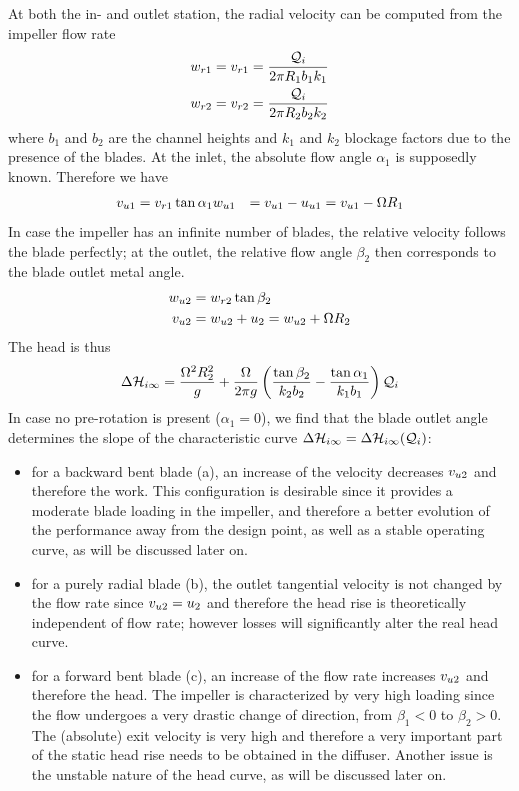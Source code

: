 At both the in- and outlet station, the radial velocity can be
computed from the impeller flow rate
\begin{align*}
  w_{r1} &= v_{r1} = \frac{\mathcal Q_i}{2 \pi  R_1 b_1 k_1} \\
  w_{r2} &= v_{r2} = \frac{\mathcal Q_i}{2 \pi  R_2 b_2 k_2} \\
\end{align*}
where $b_1$ and $b_2$ are the channel heights and $k_1$ and $k_2$
blockage factors due to the presence of the blades.  At the inlet, the
absolute flow angle $\alpha_1$ is supposedly known.  Therefore we have
\begin{align*}
  v_{u1} &= v_{r1} \tan \alpha_1
  w_{u1} &= v_{u1} - u_{u1} = v_{u1} - \Omega R_1
\end{align*}
In case the impeller has an infinite number of blades, the relative
velocity follows the blade perfectly; at the outlet, the relative flow
angle $\beta_2$ then corresponds to the blade outlet metal angle.
\begin{align*}
  w_{u2} &= w_{r2} \tan \beta_2 \\
  v_{u2} &= w_{u2} + u_2 = w_{u2} + \Omega R_2
\end{align*}
The head is thus
\begin{equation}
  \Delta \mathcal H_{i\infty} = \frac{\Omega^2 R_2^2}{g} + 
  \frac{\Omega}{2 \pi g} \left(
    \frac{\tan \beta_2}{k_2 b_2} - 
    \frac{\tan \alpha_1}{k_1 b_1}\right) \mathcal Q_i
\end{equation}
In case no pre-rotation is present (\ie $\alpha_1=0$), we find that
the blade outlet angle determines the slope of the characteristic
curve $\Delta \mathcal H_{i\infty} = \Delta \mathcal H_{i\infty}(\mathcal Q_i)$: 
\begin{itemize}
\item for a backward bent blade (a), an increase of the velocity
  decreases $v_{u2}$ and therefore the work. This configuration is
  desirable since it provides a moderate blade loading in the
  impeller, and therefore a better evolution of the performance away
  from the design point, as well as a stable operating curve, as will
  be discussed later on.
\item for a purely radial blade (b), the outlet tangential velocity is
  not changed by the flow rate since $v_{u2} = u_2$ and
  therefore the head rise is theoretically independent of flow rate;
  however losses will significantly alter the real head curve.
\item for a forward bent blade (c), an increase of the flow rate
  increases $v_{u2}$ and therefore the head. The impeller is
  characterized by very high loading since the flow undergoes a very
  drastic change of direction, from $\beta_1 < 0$ to $\beta_2 >
  0$. The (absolute) exit velocity is very high and therefore a very
  important part of the static head rise needs to be obtained in the
  diffuser. Another issue is the unstable nature of the head curve, as
  will be discussed later on.
\end{itemize}

